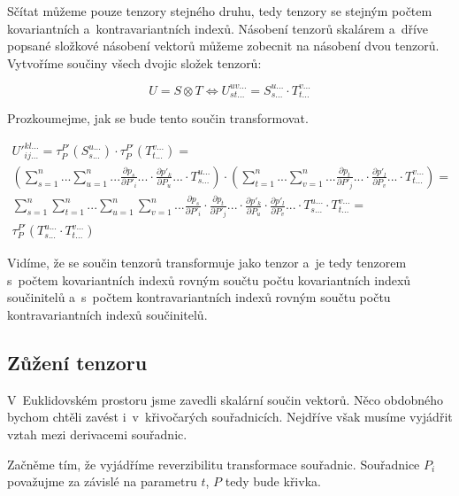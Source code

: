 Sčítat můžeme pouze tenzory stejného druhu, tedy tenzory se stejným počtem kovariantních a~kontravariantních indexů. Násobení tenzorů skalárem a~dříve popsané složkové násobení vektorů můžeme zobecnit na násobení dvou tenzorů. Vytvoříme součiny všech dvojic složek tenzorů:

\begin{equation}
\label{eq:nasobeni_tenzoru}
U = S \otimes T \Leftrightarrow U_{st...}^{uv...} = S_{s...}^{u...} \cdot T_{t...}^{v...}
\end{equation}

Prozkoumejme, jak se bude tento součin transformovat.

\begin{equation}
\begin{split}
U'^{kl...}_{ij...} = \tau_{P}^{P'}(S_{s...}^{u...}) \cdot \tau_{P}^{P'}(T_{t...}^{v...}) = \\
\left( \sum_{s=1}^n ... \sum_{u=1}^n ... \frac{\partial p_s}{\partial P'_i} ... \cdot \frac{\partial p'_k}{\partial P_u} ... \cdot T_{s...}^{u...} \right) \cdot \left( \sum_{t=1}^n ... \sum_{v=1}^n ... \frac{\partial p_t}{\partial P'_j} ... \cdot \frac{\partial p'_l}{\partial P_v} ... \cdot T_{t...}^{v...} \right) = \\
\sum_{s=1}^n \sum_{t=1}^n ... \sum_{u=1}^n \sum_{v=1}^n ... \frac{\partial p_s}{\partial P'_i} \cdot \frac{\partial p_t}{\partial P'_j} ... \cdot \frac{\partial p'_k}{\partial P_u} \cdot \frac{\partial p'_l}{\partial P_v} ... \cdot T_{s...}^{u...} \cdot T_{t...}^{v...} = \\
\tau_{P}^{P'}(T_{s...}^{u...} \cdot T_{t...}^{v...})
\end{split}
\end{equation}

Vidíme, že se součin tenzorů transformuje jako tenzor a~je tedy tenzorem s~počtem kovariantních indexů rovným součtu počtu kovariantních indexů součinitelů a~s~počtem kontravariantních indexů rovným součtu počtu kontravariantních indexů součinitelů. 

\subsection{Zůžení tenzoru}

V~Euklidovském prostoru jsme zavedli skalární součin vektorů. Něco obdobného bychom chtěli zavést i~v~křivočarých souřadnicích. Nejdříve však musíme vyjádřit vztah mezi derivacemi souřadnic.

Začněme tím, že vyjádříme reverzibilitu transformace souřadnic. Souřadnice \(P_i\) považujme za závislé na parametru \(t\), \(P\) tedy bude křivka.

